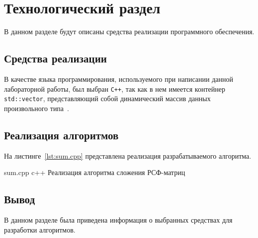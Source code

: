\chapter{Технологический раздел}
В данном разделе будут описаны средства реализации программного обеспечения.

\section{Средства реализации}
В качестве языка программирования, используемого при написании данной лабораторной работы, был выбран \texttt{C++}, так как в нем имеется контейнер \texttt{std::vector}, представляющий собой динамический массив данных произвольного типа~\cite{cpp-lang}.
	
\section{Реализация алгоритмов}
На листинге~\ref{lst:sum.cpp} представлена реализация разрабатываемого алгоритма.

\newpage 

{sum.cpp}
{c++}
{Реализация алгоритма сложения РСФ-матриц}

\section*{Вывод}
В данном разделе была приведена информация о выбранных средствах для разработки алгоритмов.